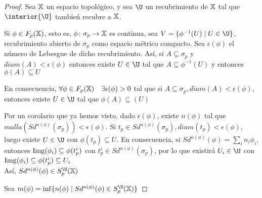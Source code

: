 \begin{proof}
  Sea ${\mathbb X}$ un espacio topológico, y sea $\U$ un recubrimiento de ${\mathbb X}$ tal que $\interior{\U}$ tambień recubre a ${\mathbb X}$.

  Si $\phi \in F_p({\mathbb X})$, esto es, $\phi \colon \sigma_p \to {\mathbb X}$ es continua, sea $V = \{\phi^{-1}(U) \mid U \in \U\}$, recubrimiento
  abierto de $\sigma_p$ como espacio métrico compacto. Sea $\epsilon(\phi)$ el número de Lebesgue de dicho recubrimiento.
  Así, si $A \subseteq \sigma_p$ y $diam(A) < \epsilon(\phi)$ entonces existe $U \in \U$ tal que $A \subseteq \phi^{-1}(U)$ y entonces
  $\phi(A) \subseteq U$

  En consecuencia, $\forall \phi \in F_p({\mathbb X}) \quad \exists \epsilon(\phi) > 0$ tal que si $A \subseteq \sigma_p, diam(A) < \epsilon(\phi)$,
  entonces existe $U \in \U$ tal que $\phi(A) \subseteq(U)$

  Por un corolario que ya hemos visto, dado $\epsilon(\phi)$, existe $n(\phi)$ tal que \\
  ${malla(Sd^{n(\phi)}(\sigma_p)) < \epsilon(\phi)}$. Si $t_p \in Sd^{n(\phi)}(\sigma_p), diam(t_p) < \epsilon(\phi)$,
  luego existe $U \in \U$ con $\phi(t_p) \subseteq U$. En consecuencia, si $Sd^{n(\phi)}(\phi) = \sum_i n_i \phi_i$,
  entonces $\operatorname{Img}(\phi_i) \subseteq \phi(t_p^i)$ con $t_p^i \in Sd^{n(\phi)}(\sigma_p)$,
  por lo que existirá $U_i \in \U$ con $\operatorname{Img}(\phi_i) \subseteq \phi(t_p^i) \subseteq U_i$ \\
  Así, $Sd^{n(\phi)}(\phi) \in S_p^\U(\X)$

  Sea $m(\phi) = \inf\{n(\phi) \mid Sd^{n(\phi)}(\phi) \in S_p^\U(\X)\}$

\end{proof}
